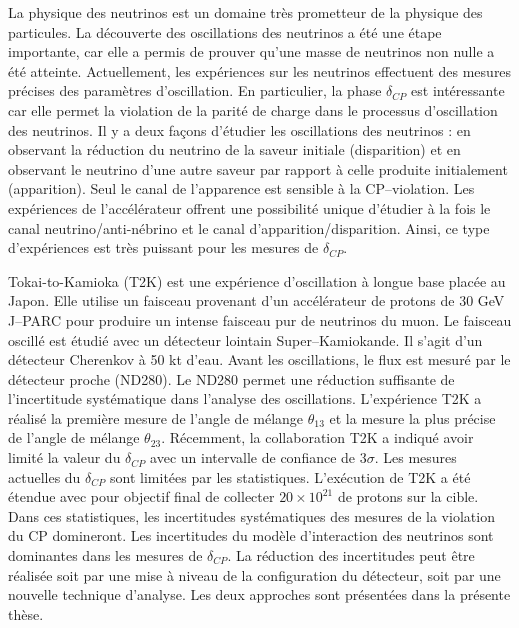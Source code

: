 \documentclass[../main.tex]{subfiles}
\begin{document}
La physique des neutrinos est un domaine très prometteur de la physique des particules. La découverte des oscillations des neutrinos a été une étape importante, car elle a permis de prouver qu'une masse de neutrinos non nulle a été atteinte. Actuellement, les expériences sur les neutrinos effectuent des mesures précises des paramètres d'oscillation. En particulier, la phase $\delta_{CP}$ est intéressante car elle permet la violation de la parité de charge dans le processus d'oscillation des neutrinos. Il y a deux façons d'étudier les oscillations des neutrinos : en observant la réduction du neutrino de la saveur initiale (disparition) et en observant le neutrino d'une autre saveur par rapport à celle produite initialement (apparition). Seul le canal de l'apparence est sensible à la CP--violation. Les expériences de l'accélérateur offrent une possibilité unique d'étudier à la fois le canal neutrino/anti-nébrino et le canal d'apparition/disparition. Ainsi, ce type d'expériences est très puissant pour les mesures de $\delta_{CP}$.

Tokai-to-Kamioka (T2K) est une expérience d'oscillation à longue base placée au Japon. Elle utilise un faisceau provenant d'un accélérateur de protons de 30 GeV J--PARC pour produire un intense faisceau pur de neutrinos du muon. Le faisceau oscillé est étudié avec un détecteur lointain Super--Kamiokande. Il s'agit d'un détecteur Cherenkov à 50 kt d'eau. Avant les oscillations, le flux est mesuré par le détecteur proche (ND280). Le ND280 permet une réduction suffisante de l'incertitude systématique dans l'analyse des oscillations. L'expérience T2K a réalisé la première mesure de l'angle de mélange $\theta_{13}$ et la mesure la plus précise de l'angle de mélange $\theta_{23}$. Récemment, la collaboration T2K a indiqué avoir limité la valeur du $\delta_{CP}$ avec un intervalle de confiance de 3$\sigma$. Les mesures actuelles du $\delta_{CP}$ sont limitées par les statistiques. L'exécution de T2K a été étendue avec pour objectif final de collecter $20\times10^{21}$ de protons sur la cible. Dans ces statistiques, les incertitudes systématiques des mesures de la violation du CP domineront. Les incertitudes du modèle d'interaction des neutrinos sont dominantes dans les mesures de $\delta_{CP}$. La réduction des incertitudes peut être réalisée soit par une mise à niveau de la configuration du détecteur, soit par une nouvelle technique d'analyse. Les deux approches sont présentées dans la présente thèse.


\vspace{1cm}
\end{document}
